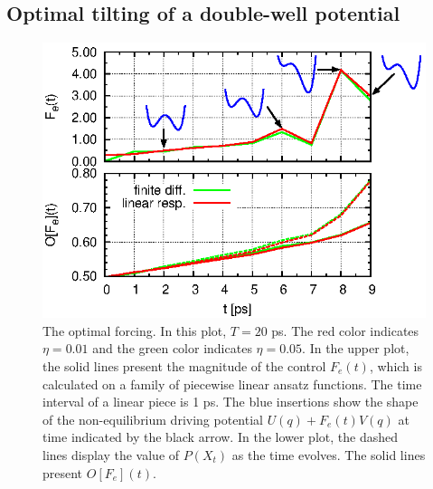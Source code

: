 \documentclass[]{tMPH2e}
\begin{document}
\subsection{Optimal tilting of a double-well potential}
\begin{figure}
  \centering
  \includegraphics[]{figs/fig-ctr-stat-2.eps}
  \caption{The optimal forcing.  In this plot, $T=20$ ps.  The red
    color indicates $\eta = 0.01$ and the green color indicates $\eta
    = 0.05$.  In the upper plot, the solid lines present the magnitude
    of the control $F_e(t)$, which is calculated on a family of
    piecewise linear ansatz functions. The time interval of a linear
    piece is 1 ps.  The blue insertions show the shape of the
    non-equilibrium driving potential $U( q) + F_e(t)V(
    q)$ at time indicated by the black arrow.  In the lower plot, the
    dashed lines display the value of $P( X_t)$ as the time
    evolves.  The solid lines present $O[F_e](t)$.  }\label{fig:tmp7}
\end{figure}
\end{document}
